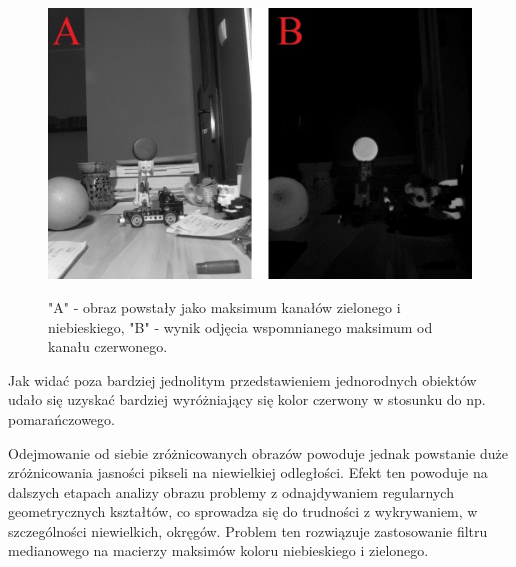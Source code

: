 \begin{figure}[H]
\begin{center}
\includegraphics[scale=0.42]{imgs/imgMax+RwoBG.jpg}
\caption[Kanał czerwony minus maksimum zielonego i niebieskiego.]\small{"A" - obraz powstały jako maksimum kanałów zielonego i niebieskiego, "B" - wynik odjęcia wspomnianego maksimum od kanału czerwonego.}
\label{red-max}
\end{center}
\end{figure}
Jak widać poza bardziej jednolitym przedstawieniem jednorodnych obiektów udało się uzyskać bardziej wyróżniający się kolor czerwony w stosunku do np. pomarańczowego.

Odejmowanie od siebie zróżnicowanych obrazów powoduje jednak powstanie duże zróżnicowania jasności pikseli na niewielkiej odległości.  Efekt ten powoduje na dalszych etapach analizy obrazu problemy z odnajdywaniem regularnych geometrycznych kształtów, co sprowadza się do trudności z wykrywaniem, w szczególności niewielkich, okręgów. Problem ten rozwiązuje zastosowanie filtru medianowego na macierzy maksimów koloru niebieskiego i zielonego.

